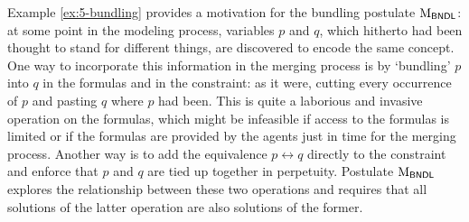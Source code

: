 Example \ref{ex:5-bundling} provides a motivation for the bundling postulate $\mathrm{M}_{\mathsf{BNDL}}$: 
at some point in the modeling process, variables $p$ and $q$, 
which hitherto had been thought to stand for different things,
are discovered to encode the same concept.
One way to incorporate this information 
in the merging process is by `bundling' $p$ into $q$ in the formulas and in the constraint:
as it were, cutting every occurrence of $p$ and pasting $q$ where $p$ had been.
This is quite a laborious and invasive operation on the formulas, 
which might be infeasible if access to the formulas is limited or if the formulas are provided 
by the agents just in time for the merging process.
Another way is to add the equivalence $p \leftrightarrow q$ directly to the constraint
and enforce that $p$ and $q$ are tied up together in perpetuity.
Postulate $\mathrm{M}_{\mathsf{BNDL}}$ explores the relationship between these two operations 
and requires that all solutions of the latter operation are also solutions of the former.

